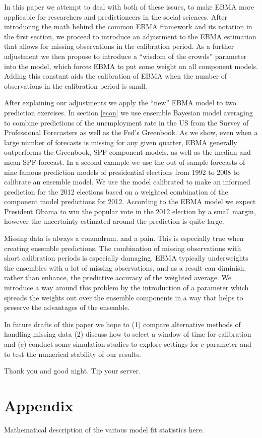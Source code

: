 \documentclass[12pt,fullpage,endnotes]{article}
\begin{document}
In this paper we attempt to deal with both of these issues, to make EBMA more applicable for researchers and predictioneers in the social sciences. After introducing the math behind the common EBMA framework and its notation in the first section, we proceed to introduce an adjustment to the EBMA estimation that allows for missing observations in the calibration period. As a further adjustment we then propose to introduce a ``wisdom of the crowds'' parameter into the model, which forces EBMA to put some weight on all component models. Adding this constant aids the calibration of EBMA when the number of observations in the calibration period is small. 

After explaining our adjustments we apply the ``new'' EBMA model to two prediction exercises. In section \ref{econ} we use ensemble Bayesian model averaging to combine predictions of the unemployment rate in the US from the Survey of Professional Forecasters as well as the Fed's Greenbook. As we show, even when a large number of forecasts is missing for any given quarter, EBMA generally outperforms the Greenbook, SPF component models, as well as the median and mean SPF forecast. In a second example we use the out-of-sample forecasts of nine famous prediction models of presidential elections from 1992 to 2008 to calibrate an ensemble model. We use the model calibrated to make an informed prediction for the 2012 elections based on a weighted combination of the component model predictions for 2012. According to the EBMA model we expect President Obama to win the popular vote in the 2012 election by a small margin, however the uncertainty estimated around the prediction is quite large.

Missing data is always a conundrum, and a pain. This is especially true when creating ensemble predictions. The combination of missing observations with short calibration periods is especially damaging. EBMA typically underweights the ensembles with a lot of missing observations, and as a result can diminish, rather than enhance, the predictive accuracy of the weighted average. We introduce a way around this problem by the introduction of a parameter which spreads the weights out over the ensemble components in a way that helps to preserve the advantages of the ensemble.  

In future drafts of this paper we hope to (1) compare alternative
methods of handling missing data (2) discuss how to select a window of
time for calibration and (c) conduct some simulation studies to
explore settings for $c$ parameter and to test the numerical stability
of our results.

Thank you and good night. Tip your server.

 \newpage
 \appendix


 \section*{Appendix}

Mathematical description of the various model fit statistics here.  


\singlespacing


\end{document}
